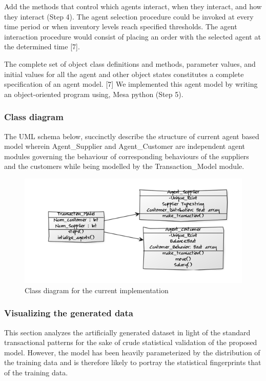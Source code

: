 \documentclass[]{article}
\begin{document}
Add the methods that control which agents interact, when they interact,
and how they interact (Step 4). The agent selection procedure could be
invoked at every time period or when inventory levels reach specified
thresholds. The agent interaction procedure would consist of placing an
order with the selected agent at the determined time {[}7{]}.

The complete set of object class definitions and methods, parameter
values, and initial values for all the agent and other object states
constitutes a complete specification of an agent model. {[}7{]} We
implemented this agent model by writing an object-oriented program
using, Mesa python (Step 5).

\subsubsection{Class diagram}\label{class-diagram}

The UML schema below, succinctly describe the structure of current agent
based model wherein Agent\_Supplier and Agent\_Customer are independent
agent modules governing the behaviour of corresponding behaviours of the
suppliers and the customers while being modelled by the
Transaction\_Model module.

\begin{figure}
\centering
\includegraphics{uploads/upload_33eb3ed0e4788936cb068a5e55703918.png}
\caption{Class diagram for the current implementation}
\end{figure}

\subsubsection{Visualizing the generated
data}\label{visualizing-the-generated-data}

This section analyzes the artificially generated dataset in light of the
standard transactional patterns for the sake of crude statistical
validation of the proposed model. However, the model has been heavily
parameterized by the distribution of the training data and is therefore
likely to portray the statistical fingerprints that of the training
data.
\end{document}
